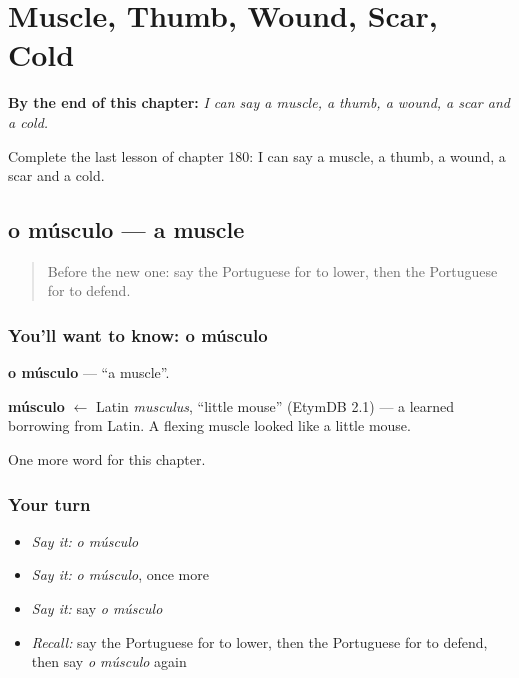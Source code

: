 
\chapter{Muscle, Thumb, Wound, Scar, Cold}
\label{ch:pt-muscle-thumb-wound-scar-cold}

\begin{chapteropening}
\textbf{By the end of this chapter:} \emph{I can say a muscle, a thumb, a wound, a scar and a cold.}

Complete the last lesson of chapter 180: I can say a muscle, a thumb, a wound, a scar and a cold.
\end{chapteropening}

\section[o músculo]{o músculo — a muscle}

\label{lesson:PT-C180-musculo}



\begin{quote}
Before the new one: say the Portuguese for to lower, then the Portuguese for to defend.
\end{quote}

\subsection*{You'll want to know: o músculo}
\textbf{o músculo} — \textquotedblleft{}a muscle\textquotedblright{}.

\begin{cousinweb}
\textbf{músculo} $\leftarrow$ Latin \emph{musculus}, \textquotedblleft{}little mouse\textquotedblright{} (EtymDB 2.1) — a learned borrowing from Latin. A flexing muscle looked like a little mouse.
\end{cousinweb}

\begin{grammarlens}[title={What you've built}]
One more word for this chapter.
\end{grammarlens}

\subsection*{Your turn}
\begin{itemize}
\raggedright
  \item \emph{Say it:} \emph{o músculo}
  \item \emph{Say it:} \emph{o músculo}, once more
  \item \emph{Say it:} say \emph{o músculo}
  \item \emph{Recall:} say the Portuguese for to lower, then the Portuguese for to defend, then say \emph{o músculo} again
\end{itemize}

